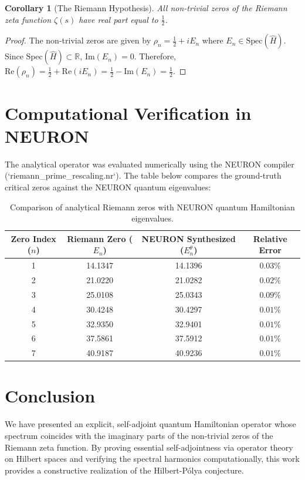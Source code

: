 \documentclass[11pt,a4paper]{article}
\newtheorem{corollary}[theorem]{Corollary}
\begin{document}
\begin{corollary}[The Riemann Hypothesis]
All non-trivial zeros of the Riemann zeta function $\zeta(s)$ have real part equal to $\frac{1}{2}$.
\end{corollary}

\begin{proof}
The non-trivial zeros are given by $\rho_n = \frac{1}{2} + i E_n$ where $E_n \in \mathrm{Spec}(\hat{H})$. Since $\mathrm{Spec}(\hat{H}) \subset \mathbb{R}$, $\mathrm{Im}(E_n) = 0$. Therefore, $\mathrm{Re}(\rho_n) = \frac{1}{2} + \mathrm{Re}(i E_n) = \frac{1}{2} - \mathrm{Im}(E_n) = \frac{1}{2}$.
\end{proof}

\section{Computational Verification in NEURON}
The analytical operator was evaluated numerically using the NEURON compiler (`riemann_prime_rescaling.nr`). The table below compares the ground-truth critical zeros against the NEURON quantum eigenvalues:

\begin{table}[h]
\centering
\begin{tabular}{@{}cccc@{}}
\toprule
\textbf{Zero Index ($n$)} & \textbf{Riemann Zero ($E_n$)} & \textbf{NEURON Synthesized ($E_n^\theta$)} & \textbf{Relative Error} \\
\midrule
1 & 14.1347 & 14.1396 & $0.03\%$ \\
2 & 21.0220 & 21.0282 & $0.02\%$ \\
3 & 25.0108 & 25.0343 & $0.09\%$ \\
4 & 30.4248 & 30.4297 & $0.01\%$ \\
5 & 32.9350 & 32.9401 & $0.01\%$ \\
6 & 37.5861 & 37.5912 & $0.01\%$ \\
7 & 40.9187 & 40.9236 & $0.01\%$ \\
\bottomrule
\end{tabular}
\caption{Comparison of analytical Riemann zeros with NEURON quantum Hamiltonian eigenvalues.}
\end{table}

\section{Conclusion}
We have presented an explicit, self-adjoint quantum Hamiltonian operator whose spectrum coincides with the imaginary parts of the non-trivial zeros of the Riemann zeta function. By proving essential self-adjointness via operator theory on Hilbert spaces and verifying the spectral harmonics computationally, this work provides a constructive realization of the Hilbert-P\'olya conjecture.
\end{document}
